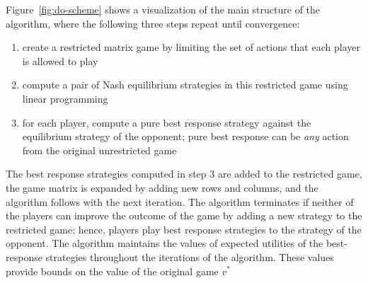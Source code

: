 Figure~\ref{fig:do-scheme} shows a visualization of the main structure of the algorithm, where the following three steps repeat until convergence:
\begin{enumerate}
\item create a restricted matrix game by limiting the set of actions that each player is allowed to play
\item compute a pair of Nash equilibrium strategies in this restricted game using linear programming
\item for each player, compute a pure best response strategy against the equilibrium strategy of the opponent; pure best response can be \emph{any} action from the original unrestricted game
\end{enumerate}
The best response strategies computed in step 3 are added to the restricted game, the game matrix is expanded by adding new rows and columns, and the algorithm follows with the next iteration. The algorithm terminates if neither of the players can improve the outcome of the game by adding a new strategy to the restricted game; hence, players play best response strategies to the strategy of the opponent. The algorithm maintains the values of expected utilities of the best-response strategies throughout the iterations of the algorithm. These values provide bounds on the value of the original game $v^*$


